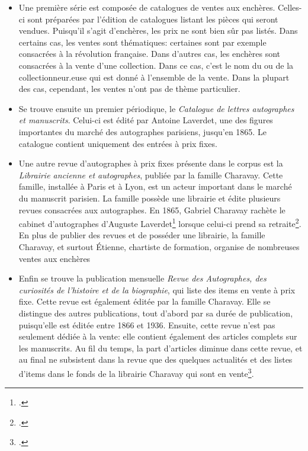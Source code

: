 \begin{itemize}
	\item Une première série est composée de catalogues de ventes aux enchères. Celles-ci sont préparées par l'édition de catalogues listant les pièces qui seront vendues. Puisqu'il s'agit d'enchères, les prix ne sont bien sûr pas listés. Dans certains cas, les ventes sont thématiques: certaines sont par exemple consacrées à la révolution française. Dans d'autres cas, les enchères sont consacrées à la vente d'une collection. Dans ce cas, c'est le nom du ou de la collectionneur.euse qui est donné à l'ensemble de la vente. Dans la plupart des cas, cependant, les ventes n'ont pas de thème particulier.
	\item Se trouve ensuite un premier périodique, le \textit{Catalogue de lettres autographes et manuscrits}. Celui-ci est édité par Antoine Laverdet, une des figures importantes du marché des autographes parisiens, jusqu'en 1865. Le catalogue contient uniquement des entrées à prix fixes.
	\item Une autre revue d'autographes à prix fixes présente dans le corpus est la \textit{Librairie ancienne et autographes}, publiée par la famille Charavay. Cette famille, installée à Paris et à Lyon, est un acteur important dans le marché du manuscrit parisien. La famille possède une librairie et édite plusieurs revues consacrées aux autographes. En 1865, Gabriel Charavay rachète le cabinet d'autographes d'Auguste Laverdet\footcite[p. 18-21]{rondeau_du_noyer_encoder_2019} lorsque celui-ci prend sa retraite\footcite[p. 3]{gabay_selling_2020}. En plus de publier des revues et de posséder une librairie, la famille Charavay, et surtout Étienne, chartiste de formation, organise de nombreuses ventes aux enchères
	\item Enfin se trouve la publication mensuelle \textit{Revue des Autographes, des curiosités de l’histoire et de la biographie}, qui liste des items en vente à prix fixe. Cette revue est également éditée par la famille Charavay. Elle se distingue des autres publications, tout d'abord par sa durée de publication, puisqu'elle est éditée entre 1866 et 1936. Ensuite, cette revue n'est pas seulement dédiée à la vente: elle contient également des articles complets sur les manuscrits. Au fil du temps, la part d'articles diminue dans cette revue, et au final ne subsistent dans la revue que des quelques actualités et des listes d'items dans le fonds de la librairie Charavay qui sont en vente\footcite[p. 3]{gabay_selling_2020}.
\end{itemize}

